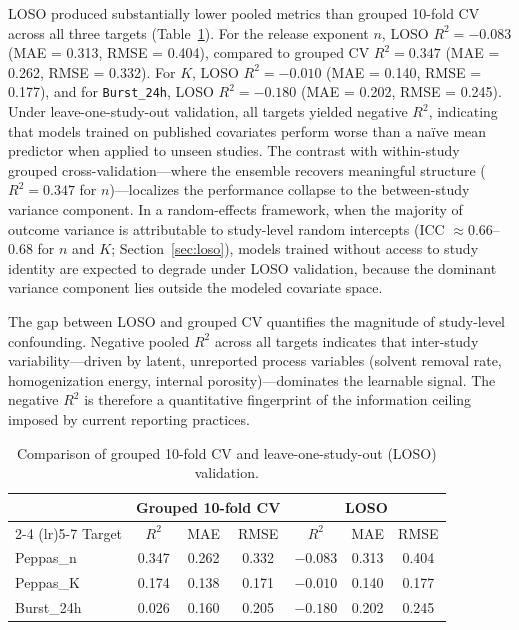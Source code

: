LOSO produced substantially lower pooled metrics than grouped 10-fold CV across all three targets (Table~\ref{tab:loso}). For the release exponent $n$, LOSO $R^2 = -0.083$ (MAE = 0.313, RMSE = 0.404), compared to grouped CV $R^2 = 0.347$ (MAE = 0.262, RMSE = 0.332). For $K$, LOSO $R^2 = -0.010$ (MAE = 0.140, RMSE = 0.177), and for \texttt{Burst\_24h}, LOSO $R^2 = -0.180$ (MAE = 0.202, RMSE = 0.245). Under leave-one-study-out validation, all targets yielded negative $R^2$, indicating that models trained on published covariates perform worse than a na\"ive mean predictor when applied to unseen studies. The contrast with within-study grouped cross-validation---where the ensemble recovers meaningful structure ($R^2 = 0.347$ for $n$)---localizes the performance collapse to the between-study variance component. In a random-effects framework, when the majority of outcome variance is attributable to study-level random intercepts (ICC $\approx 0.66$--0.68 for $n$ and $K$; Section~\ref{sec:loso}), models trained without access to study identity are expected to degrade under LOSO validation, because the dominant variance component lies outside the modeled covariate space.

The gap between LOSO and grouped CV quantifies the magnitude of study-level confounding. Negative pooled $R^2$ across all targets indicates that inter-study variability---driven by latent, unreported process variables (solvent removal rate, homogenization energy, internal porosity)---dominates the learnable signal. The negative $R^2$ is therefore a quantitative fingerprint of the information ceiling imposed by current reporting practices.


\begin{table}[H]
\centering
\caption{Comparison of grouped 10-fold CV and leave-one-study-out (LOSO) validation.}
\label{tab:loso}
\begin{tabular}{lcccccc}
\toprule
 & \multicolumn{3}{c}{Grouped 10-fold CV} & \multicolumn{3}{c}{LOSO} \\
\cmidrule(lr){2-4} \cmidrule(lr){5-7}
Target & $R^2$ & MAE & RMSE & $R^2$ & MAE & RMSE \\
\midrule
Peppas\_n & 0.347 & 0.262 & 0.332 & $-0.083$ & 0.313 & 0.404 \\
Peppas\_K & 0.174 & 0.138 & 0.171 & $-0.010$ & 0.140 & 0.177 \\
Burst\_24h & 0.026 & 0.160 & 0.205 & $-0.180$ & 0.202 & 0.245 \\
\bottomrule
\end{tabular}
\end{table}

